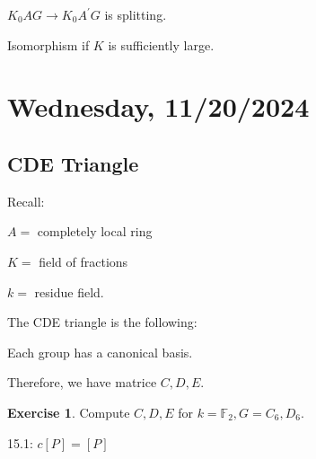 \documentclass{article}
\theoremstyle{definition}
\newtheorem*{exercise}{Exercise}
\begin{document}
\begin{center}
\end{center}

\(K_0 AG \to K_0 A^{\prime} G\) is splitting.

Isomorphism if \(K\) is sufficiently large.

\section*{Wednesday, 11/20/2024}

\subsection*{CDE Triangle}

Recall:

\(A =\) completely local ring

\(K =\) field of fractions

\(k =\) residue field.

\begin{center}
\end{center}

The CDE triangle is the following:

\begin{center}
\end{center}

Each group has a canonical basis.

Therefore, we have matrice \(C,D,E\).

\begin{exercise}
    Compute \(C,D,E\) for \(k = \mathbb{F}_2, G = C_6, D_6\). 
\end{exercise}

15.1: \(c[P]=[P]\)
\end{document}

